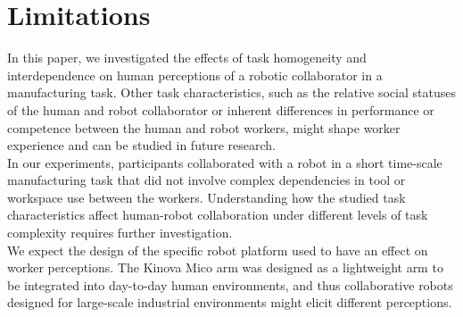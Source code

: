 \section{Limitations}
       In this paper, we investigated the effects of task homogeneity and interdependence on human perceptions of a robotic collaborator in a manufacturing task. Other task characteristics, such as the relative social statuses of the human and robot collaborator or inherent differences in performance or competence between the human and robot workers, might shape worker experience and can be studied in future research.\\ 
       In our experiments, participants collaborated with a robot in a short time-scale manufacturing task that did not involve complex dependencies in tool or workspace use between the workers. Understanding how the studied task characteristics affect human-robot collaboration under different levels of task complexity requires further investigation.\\
       We expect the design of the specific robot platform used to have an effect on worker perceptions. The Kinova Mico arm was designed as a lightweight arm to be integrated into day-to-day human environments, and thus collaborative robots designed for large-scale industrial environments might elicit different perceptions. 
